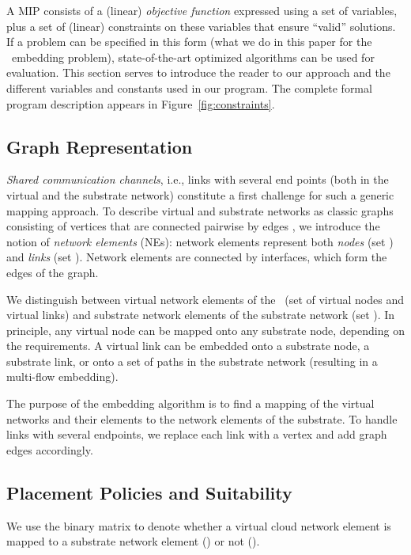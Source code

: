 \documentclass[conference,10pt]{IEEEtran}
\newcommand{\CloudNet}{\text{CloudNet}}
\begin{document}
A MIP consists of a (linear) \emph{objective function} expressed
using a set of variables, plus a set of (linear) constraints on
these variables that ensure ``valid'' solutions. If a problem can be
specified in this form (what we do in this paper for the \CloudNet\
embedding problem), state-of-the-art optimized algorithms can be
used for evaluation. This section serves to introduce the reader to
our approach and the different variables and constants used in our
program. The complete formal program description appears in
Figure~\ref{fig:constraints}.


\subsection{Graph Representation}\label{ssec:defs}


\emph{Shared communication channels}, i.e., links with several end
points (both in the virtual and the substrate network) constitute a
first challenge for such a generic mapping approach.
To describe virtual and substrate networks as classic graphs 
consisting of vertices  that are connected pairwise by edges ,
we introduce the notion of \emph{network elements} (NEs):
network elements represent both \emph{nodes} (set ) and \emph{links}
(set ). Network elements are connected by interfaces, which
form the edges of the graph.

We distinguish between virtual network elements of the \CloudNet\
(set  of virtual nodes and virtual links)
and substrate network elements of the substrate network (set
). In principle, any virtual node can be
mapped onto any substrate node, depending on the
requirements. A virtual link can be embedded onto a substrate node,
a substrate link, or onto a set of paths in the substrate network
(resulting in a multi-flow embedding).


The purpose of the embedding algorithm is to find a mapping of the
virtual networks and their elements to the network elements of the
substrate. To handle links with several endpoints, we replace
each link with a vertex and add graph edges accordingly.



\subsection{Placement Policies and Suitability} \label{ssec:map:approach:policies}

We use the binary matrix  to denote whether a virtual
cloud network element 
is mapped to a substrate network element  () or not ().
\end{document}
